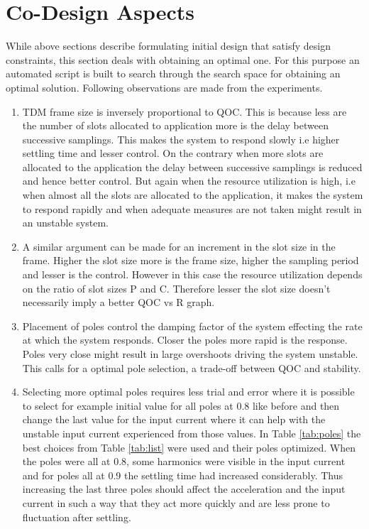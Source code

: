 \section{Co-Design Aspects}
\label{sec:codesign}

While above sections describe formulating initial design that satisfy design constraints, this section deals with obtaining an optimal one. For this purpose an automated script is built to search through the search space for obtaining an optimal solution. Following observations are made from the experiments.

\begin{enumerate}
	\item TDM frame size is inversely proportional to QOC. This is because less are the number of slots allocated to application more is the delay between successive samplings. This makes the system to respond slowly i.e higher settling time and lesser control. On the contrary when more slots are allocated to the application the delay between successive samplings is reduced and hence better control. But again when the resource utilization is high, i.e when almost all the slots are allocated to the application, it makes the system to respond rapidly and when adequate measures are not taken might result in an unstable system.
	
	\item A similar argument can be made for an increment in the slot size in the frame. Higher the slot size more is the frame size, higher the sampling period and lesser is the control. However in this case the resource utilization depends on the ratio of slot sizes P and C. Therefore lesser the slot size  doesn't necessarily imply a better QOC vs R graph.
	
	\item Placement of poles control the damping factor of the system effecting the rate at which the system responds. Closer the poles more rapid is the response. Poles very close might result in large overshoots driving the system unstable. This calls for a optimal pole selection, a trade-off between QOC and stability.
	
		\item Selecting more optimal poles requires less trial and error where it is possible to select for example initial value for all poles at 0.8 like before and then change the last value for the input current where it can help with the unstable input current experienced from those values. In Table \ref{tab:poles} the best choices from Table \ref{tab:list} were used and their poles optimized. When the poles were all at 0.8, some harmonics were visible in the input current and for poles all at 0.9 the settling time had increased considerably. Thus increasing the last three poles should affect the acceleration and the input current in such a way that they act more quickly and are less prone to fluctuation after settling.
		

\end{enumerate}
